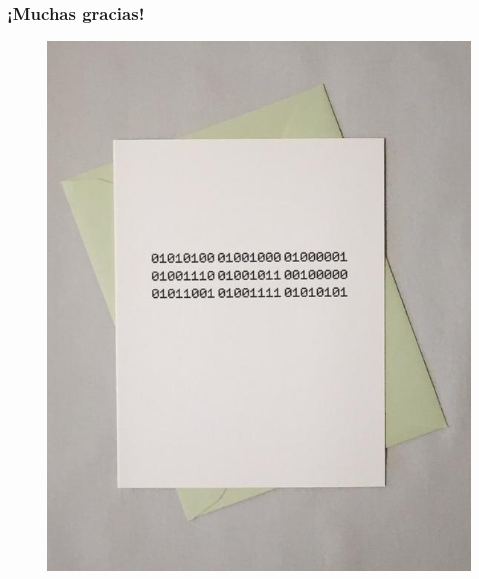 \documentclass{beamer}
\begin{document}
    \begin{frame}
        \frametitle{¡Muchas gracias!}
        \begin{figure}[]
            \centering
            \includegraphics[height=0.95\textheight]{thanks}
        \end{figure}
    \end{frame}
\end{document}

